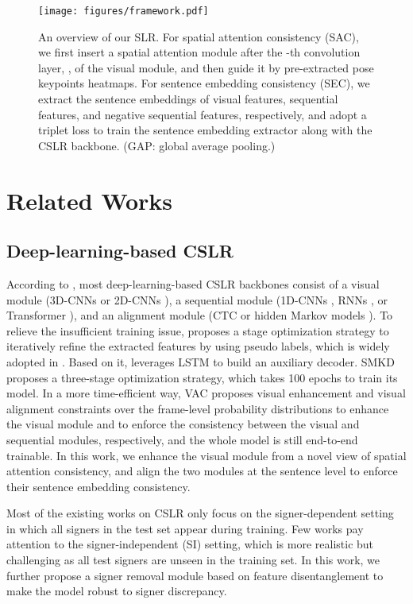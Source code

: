 \documentclass[acmsmall,screen]{acmart}
\begin{document}
%
 \begin{figure*}[t]
  \centering
  \texttt{[image: figures/framework.pdf]}
  \caption{An overview of our SLR. For spatial attention consistency (SAC), we first insert a spatial attention module after the -th convolution layer, , of the visual module, and then guide it by pre-extracted pose keypoints heatmaps. For sentence embedding consistency (SEC), we extract the sentence embeddings of visual features, sequential features, and negative sequential features, respectively, and adopt a triplet loss to train the sentence embedding extractor along with the CSLR backbone. (GAP: global average pooling.)}
  \label{fig:framework}
\end{figure*}


\section{Related Works}
\subsection{Deep-learning-based CSLR}
According to \cite{sfl}, most deep-learning-based CSLR backbones consist of a visual module (3D-CNNs \cite{iopt, csl-3} or 2D-CNNs \cite{stmc, vac, self-mutual}), a sequential module (1D-CNNs \cite{dense, fcn}, RNNs \cite{stmc, vac, self-mutual, iopt, cma}, or Transformer \cite{sfl, slt}), and an alignment module (CTC \cite{stmc, vac, self-mutual} or hidden Markov models \cite{cnn-lstm-hmm, deep-sign}).
To relieve the insufficient training issue, \cite{dnf} proposes a stage optimization strategy to iteratively refine the extracted features by using pseudo labels, which is widely adopted in \cite{iopt, cma, stmc, self-mutual}.
Based on it, \cite{iopt} leverages LSTM to build an auxiliary decoder.
SMKD \cite{self-mutual} proposes a three-stage optimization strategy, which takes 100 epochs to train its model.
In a more time-efficient way, VAC \cite{vac} proposes visual enhancement and visual alignment constraints over the frame-level probability distributions to enhance the visual module and to enforce the consistency between the visual and sequential modules, respectively, and the whole model is still end-to-end trainable.
In this work, we enhance the visual module from a novel view of spatial attention consistency, and align the two modules at the sentence level to enforce their sentence embedding consistency.

Most of the existing works on CSLR only focus on the signer-dependent setting in which all signers in the test set appear during training.
Few works pay attention to the signer-independent (SI) setting, which is more realistic but challenging as all test signers are unseen in the training set.
In this work, we further propose a signer removal module based on feature disentanglement to make the model robust to signer discrepancy.
\end{document}
